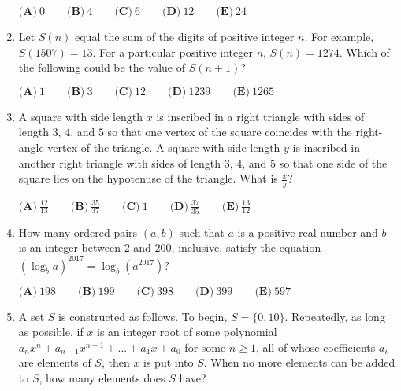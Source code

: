 \documentclass{article}
\begin{document}
\begin{enumerate}[label=\arabic*., itemsep=0.5em]
$\textbf{(A)}\ 0 \qquad\textbf{(B)}\ 4 \qquad\textbf{(C)}\ 6 \qquad\textbf{(D)}\ 12 \qquad\textbf{(E)}\ 24$\par \vspace{0.5em}\item Let $S(n)$ equal the sum of the digits of positive integer $n$. For example, $S(1507) = 13$. For a particular positive integer $n$, $S(n) = 1274$. Which of the following could be the value of $S(n+1)$?

$\textbf{(A)}\ 1 \qquad\textbf{(B)}\ 3\qquad\textbf{(C)}\ 12\qquad\textbf{(D)}\ 1239\qquad\textbf{(E)}\ 1265$\par \vspace{0.5em}\item A square with side length $x$ is inscribed in a right triangle with sides of length $3$, $4$, and $5$ so that one vertex of the square coincides with the right-angle vertex of the triangle. A square with side length $y$ is inscribed in another right triangle with sides of length $3$, $4$, and $5$ so that one side of the square lies on the hypotenuse of the triangle. What is $\tfrac{x}{y}$?

$\textbf{(A)}\ \frac{12}{13} \qquad \textbf{(B)}\ \frac{35}{37} \qquad\textbf{(C)}\ 1 \qquad\textbf{(D)}\ \frac{37}{35} \qquad\textbf{(E)}\ \frac{13}{12}$\par \vspace{0.5em}\item How many ordered pairs $(a,b)$ such that $a$ is a positive real number and $b$ is an integer between $2$ and $200$, inclusive, satisfy the equation $(\log_b a)^{2017}=\log_b(a^{2017})?$

$\textbf{(A)}\ 198\qquad\textbf{(B)}\ 199\qquad\textbf{(C)}\ 398\qquad\textbf{(D)}\ 399\qquad\textbf{(E)}\ 597$\par \vspace{0.5em}\item A set $S$ is constructed as follows. To begin, $S = \{0,10\}$. Repeatedly, as long as possible, if $x$ is an integer root of some polynomial $a_{n}x^n + a_{n-1}x^{n-1} + ... + a_{1}x + a_0$ for some $n\geq{1}$, all of whose coefficients $a_i$ are elements of $S$, then $x$ is put into $S$. When no more elements can be added to $S$, how many elements does $S$ have?


\end{enumerate}
\end{document}
